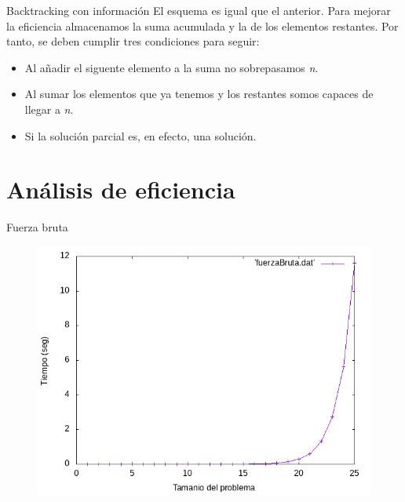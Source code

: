 \documentclass{beamer}
\begin{document}
\begin{frame}[fragile]{Backtracking con información}
El esquema es igual que el anterior. Para mejorar la eficiencia almacenamos la suma acumulada y la de los elementos restantes. Por tanto, se deben cumplir tres condiciones para seguir:
\begin{itemize}
	\item Al añadir el siguente elemento a la suma no sobrepasamos \textit{n}.
	\item Al sumar los elementos que ya tenemos y los restantes somos capaces de llegar a \textit{n}.
	\item Si la solución parcial es, en efecto, una solución.
\end{itemize}
\end{frame}

\section{Análisis de eficiencia}


\begin{frame}[fragile]{Fuerza bruta}
\begin{figure}[H]
\centering
\includegraphics[scale=0.5]{fuerzaBruta.png}
\end{figure}
\end{frame}
\end{document}
